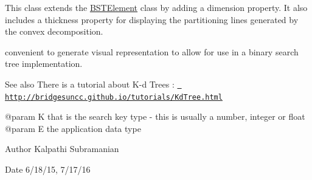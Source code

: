 This class extends the \mbox{\hyperlink{classbridges_1_1datastructure_1_1_b_s_t_element}{B\+S\+T\+Element}} class by adding a dimension property. It also includes a thickness property for displaying the partitioning lines generated by the convex decomposition.

convenient to generate visual representation to allow for use in a binary search tree implementation.

\begin{DoxySeeAlso}{See also}
There is a tutorial about K-\/d Trees \+: \href{http://bridgesuncc.github.io/tutorials/KdTree.html}{\texttt{ http\+://bridgesuncc.\+github.\+io/tutorials/\+Kd\+Tree.\+html}} \begin{DoxyVerb} @param K that is the search key type - this is usually a number, integer
    or float
 @param E the application data type
\end{DoxyVerb}

\end{DoxySeeAlso}
\begin{DoxyAuthor}{Author}
Kalpathi Subramanian 
\end{DoxyAuthor}
\begin{DoxyDate}{Date}
6/18/15, 7/17/16 
\end{DoxyDate}
